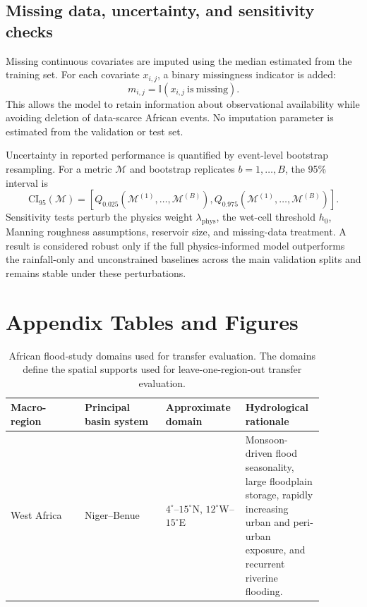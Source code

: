 \documentclass[pdflatex,sn-mathphys-ay]{sn-jnl}
\theoremstyle{thmstyleone}
\begin{document}
\begin{appendices}
\subsection{Missing data, uncertainty, and sensitivity checks}
\label{app:missing_uncertainty}

Missing continuous covariates are imputed using the median estimated
from the training set.  For each covariate $x_{i,j}$, a binary
missingness indicator is added:
\begin{equation}
  m_{i,j}
  =
  \mathbb{I}
  \left(
    x_{i,j}
    \ \mathrm{is\ missing}
  \right).
  \label{eq:app_missing_indicator}
\end{equation}
This allows the model to retain information about observational
availability while avoiding deletion of data-scarce African events.
No imputation parameter is estimated from the validation or test set.

Uncertainty in reported performance is quantified by event-level
bootstrap resampling.  For a metric $\mathcal{M}$ and bootstrap
replicates $b=1,\ldots,B$, the 95\% interval is
\begin{equation}
  \mathrm{CI}_{95}
  \left(
    \mathcal{M}
  \right)
  =
  \left[
    Q_{0.025}
    \left(
      \mathcal{M}^{(1)},\ldots,\mathcal{M}^{(B)}
    \right),
    Q_{0.975}
    \left(
      \mathcal{M}^{(1)},\ldots,\mathcal{M}^{(B)}
    \right)
  \right].
  \label{eq:app_bootstrap_ci}
\end{equation}
Sensitivity tests perturb the physics weight
$\lambda_{\mathrm{phys}}$, the wet-cell threshold $h_0$, Manning
roughness assumptions, reservoir size, and missing-data treatment.  A
result is considered robust only if the full physics-informed model
outperforms the rainfall-only and unconstrained baselines across the
main validation splits and remains stable under these perturbations.

\clearpage
\section*{Appendix Tables and Figures}

\begin{table}[p]
\centering
\small
\caption{
African flood-study domains used for transfer evaluation.  The domains define the spatial supports used for leave-one-region-out transfer evaluation.
}
\label{tab:app_study_domains}
\begin{tabular}{p{0.22\linewidth}p{0.24\linewidth}
                p{0.20\linewidth}p{0.22\linewidth}}
\toprule
Macro-region & Principal basin system & Approximate domain
& Hydrological rationale \\
\midrule
West Africa
&
Niger--Benue
&
$4^{\circ}$--$15^{\circ}$N,
$12^{\circ}$W--$15^{\circ}$E
&
Monsoon-driven flood seasonality, large floodplain storage,
rapidly increasing urban and peri-urban exposure, and recurrent
riverine flooding. \\


\end{tabular}
\end{table}
\end{appendices}
\end{document}
